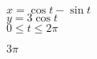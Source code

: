 {$x=\cos t - \sin t$\\$y=3\cos t$\\$0\leq t\leq 2\pi$

\noindent\begin{minipage}{\linewidth}
\centering
{}
\end{minipage}
}
{$3\pi$
}

